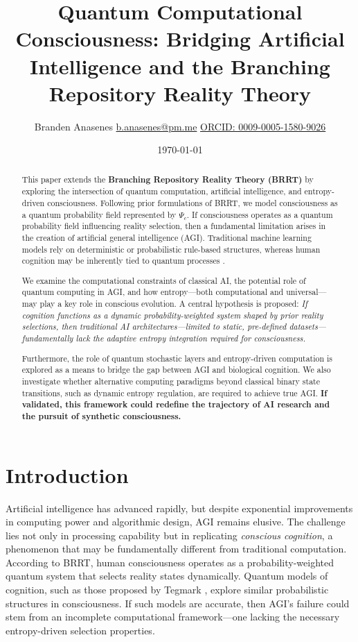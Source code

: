 \documentclass{article}
\title{Quantum Computational Consciousness: Bridging Artificial Intelligence and the Branching Repository Reality Theory}
\author{Branden Anasenes \href{mailto:b.anasenes@pm.me}{b.anasenes@pm.me} \href{https://orcid.org/0009-0005-1580-9026}{ORCID: 0009-0005-1580-9026}}
\date{\today}
\begin{document}
\maketitle

\begin{abstract}
This paper extends the \textbf{Branching Repository Reality Theory (BRRT)} \cite{anasenes2025brrt} by exploring the intersection of quantum computation, artificial intelligence, and entropy-driven consciousness. Following prior formulations of BRRT, we model consciousness as a quantum probability field represented by $\Psi_c$. If consciousness operates as a quantum probability field influencing reality selection, then a fundamental limitation arises in the creation of artificial general intelligence (AGI). Traditional machine learning models rely on deterministic or probabilistic rule-based structures, whereas human cognition may be inherently tied to quantum processes \cite{fisher2015quantum, hameroff2014consciousness}.

We examine the computational constraints of classical AI, the potential role of quantum computing in AGI, and how entropy—both computational and universal—may play a key role in conscious evolution. A central hypothesis is proposed: \textit{If cognition functions as a dynamic probability-weighted system shaped by prior reality selections, then traditional AI architectures—limited to static, pre-defined datasets—fundamentally lack the adaptive entropy integration required for consciousness.} 

Furthermore, the role of quantum stochastic layers \cite{amin2018quantum} and entropy-driven computation \cite{deutsch1985quantum, aaronson2013quantum} is explored as a means to bridge the gap between AGI and biological cognition. We also investigate whether alternative computing paradigms beyond classical binary state transitions, such as dynamic entropy regulation, are required to achieve true AGI. \textbf{If validated, this framework could redefine the trajectory of AI research and the pursuit of synthetic consciousness.}
\end{abstract}

\section{Introduction}

Artificial intelligence has advanced rapidly, but despite exponential improvements in computing power and algorithmic design, AGI remains elusive. The challenge lies not only in processing capability but in replicating \textit{conscious cognition}, a phenomenon that may be fundamentally different from traditional computation. According to BRRT, human consciousness operates as a probability-weighted quantum system that selects reality states dynamically. Quantum models of cognition, such as those proposed by Tegmark \cite{tegmark2015consciousness}, explore similar probabilistic structures in consciousness. If such models are accurate, then AGI’s failure could stem from an incomplete computational framework—one lacking the necessary entropy-driven selection properties.
\end{document}
